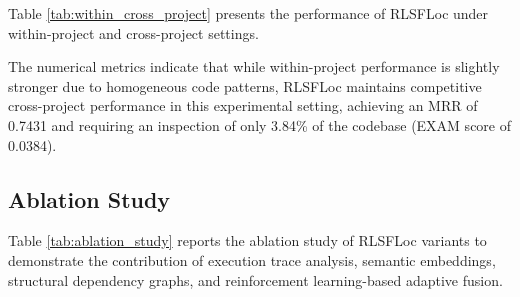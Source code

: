 \documentclass[article,article,submit,pdftex,moreauthors]{Definitions/mdpi}
\begin{document}
Table \ref{tab:within_cross_project} presents the performance of RLSFLoc under within-project and cross-project settings.

\begin{table}[H]
\caption{Within-Project and Cross-Project Evaluation of RLSFLoc}
\label{tab:within_cross_project}
\centering
\renewcommand{\arraystretch}{1.15}
\end{table}

The numerical metrics indicate that while within-project performance is slightly stronger due to homogeneous code patterns, RLSFLoc maintains competitive cross-project performance in this experimental setting, achieving an MRR of 0.7431 and requiring an inspection of only 3.84\% of the codebase (EXAM score of 0.0384).

\subsection{Ablation Study}

Table \ref{tab:ablation_study} reports the ablation study of RLSFLoc variants to demonstrate the contribution of execution trace analysis, semantic embeddings, structural dependency graphs, and reinforcement learning-based adaptive fusion.

\begin{table}[H]
\caption{Ablation Study of RLSFLoc Components}
\label{tab:ablation_study}
\centering
\renewcommand{\arraystretch}{1.15}
\end{table}
\end{document}
